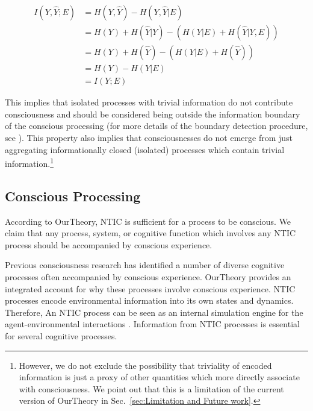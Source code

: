 \documentclass[utf8]{article}
\begin{document}
    			\begin{equation}
    			    \begin{aligned}
                        I(Y,\hat{Y};E) & = H(Y,\hat{Y}) - H(Y,\hat{Y}|E) \\
                                       & = H(Y) + H(\hat{Y}|Y) - (H(Y|E)+H(\hat{Y}|Y,E)) \\
                                       & = H(Y) + H(\hat{Y}) - (H(Y|E)+H(\hat{Y})) \\
                                       & = H(Y) - H(Y|E)\\
                                       & = I(Y;E)				
    				\end{aligned}
    			\end{equation}
                
                This implies that isolated processes with trivial information do not contribute consciousness and should be considered being outside the information boundary of the conscious processing (for more details of the boundary detection procedure, see \cite{krakauer2014information}). 
                This property also implies that consciousnesses do not emerge from just aggregating informationally closed (isolated) processes which contain trivial information.\footnote{However, we do not exclude the possibility that triviality of encoded information is just a proxy of other quantities which more directly associate with consciousness. We point out that this is a limitation of the current version of \ac{OurTheory} in Sec.~\ref{sec:Limitation and Future work}.}
                
                
                



		\subsection{Conscious Processing}\label{sec:conscious processing}
		    According to \ac{OurTheory}, NTIC is sufficient for a process to be conscious. We claim that any process, system, or cognitive function which involves any NTIC process should be accompanied by conscious experience. 
		    
		    Previous consciousness research has identified a number of diverse cognitive processes often accompanied by conscious experience. \ac{OurTheory} provides an integrated account for why these processes involve conscious experience. NTIC processes encode environmental information into its own states and dynamics. Therefore, An NTIC process can be seen as an internal simulation engine for the agent-environmental interactions \citep{BERTSCHINGER.2006}. Information from NTIC processes is essential for several cognitive processes. 
		    
\end{document}
